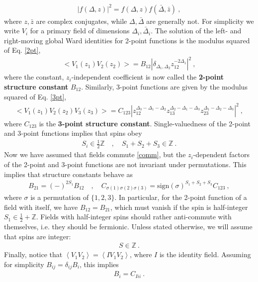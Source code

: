 \documentclass[12pt, a4paper]{article}
\theoremstyle{break}
\begin{document}
\begin{align}
 \left| f(\Delta, z)\right|^2 = f(\Delta, z)f(\bar\Delta,\bar z)\ ,
 \label{fdz2}
\end{align}
where $z,\bar z$ are complex conjugates, while $\Delta,\bar\Delta$ are generally not. 
For simplicity we write $V_i$ for a primary field of dimensions $\Delta_i,\bar\Delta_i$.
The solution of the left- and right-moving global Ward identities for 2-point functions is the modulus squared of Eq. \eqref{2pt},
\begin{align}
\boxed{ \Big< V_1(z_1)V_2(z_2) \Big> = B_{12} \left|\delta_{\Delta_1,\Delta_2} z_{12}^{-2\Delta_1}\right|^2} \ ,
\label{2ptb}
\end{align}
where the constant, $z_i$-independent coefficient is now called the \textbf{2-point structure constant} $B_{12}$. Similarly, 3-point functions are given by the modulus squared of Eq. \eqref{3pt},
\begin{align}
 \boxed{  \Big< V_1(z_1)V_2(z_2)V_3(z_3) \Big> = C_{123} \left|z_{12}^{\Delta_3-\Delta_1-\Delta_2} z_{13}^{\Delta_2-\Delta_1-\Delta_3} z_{23}^{\Delta_1-\Delta_2-\Delta_3}\right|^2 }\ ,
 \label{3ptc}
\end{align}
where $C_{123}$ is the \textbf{3-point structure constant}. Single-valuedness of the 2-point and 3-point functions implies that spins obey
\begin{align}
 S_i\in\frac12 \mathbb{Z} \quad , \quad S_1+S_2+S_3 \in\mathbb{Z}\ . 
 \label{sihz}
\end{align}
Now we have assumed that fields commute \eqref{comm}, but the $z_i$-dependent factors of the 2-point and 3-point functions are not invariant under permutations. This implies that structure constants behave as
\begin{align}
 B_{21} = (-)^{2S_1} B_{12} \quad ,\quad C_{\sigma(1)\sigma(2)\sigma(3)} = \text{sign}(\sigma)^{S_1+S_2+S_3} C_{123}\ , 
 \label{b21}
\end{align}
where $\sigma$ is a permutation of $\{1,2,3\}$. In particular, for the 2-point function of a field with itself, we have $B_{12}=B_{21}$, which must vanish if the spin is half-integer $S_1\in \frac12+\mathbb{Z}$. Fields with half-integer spins should rather anti-commute with themselves, i.e. they should be fermionic. 
Unless stated otherwise, we will assume that spins are integer:
\begin{align}
 \boxed{S\in \mathbb{Z}}\ .
 \label{siz}
\end{align}
Finally, notice that $\left<V_1V_2\right> = \left<IV_1V_2\right>$, where $I$ is the identity field. Assuming for simplicity $B_{ij}=\delta_{ij}B_i$, this implies 
\begin{align}
 B_i = C_{Iii}\ .
 \label{bicii}
\end{align}
\end{document}
